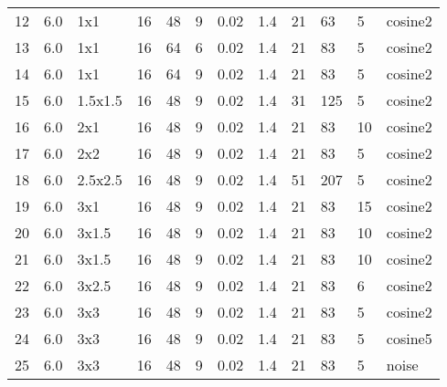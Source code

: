 \begin{center}
\begin{tabular}{l | c | l | l l l l l l l l | l}
        12  & 6.0    & 1x1       & 16    & 48       & 9      & 0.02             & 1.4                  & 21               & 63    & 5   & cosine2 \\ 
        13  & 6.0    & 1x1       & 16    & 64       & 6      & 0.02             & 1.4                  & 21               & 83    & 5   & cosine2 \\ 
        14  & 6.0    & 1x1       & 16    & 64       & 9      & 0.02             & 1.4                  & 21               & 83    & 5   & cosine2 \\
        15  & 6.0    & 1.5x1.5   & 16    & 48       & 9      & 0.02             & 1.4                  & 31               & 125   & 5   & cosine2 \\
        16  & 6.0    & 2x1       & 16    & 48       & 9      & 0.02             & 1.4                  & 21               & 83    & 10  & cosine2 \\ 
        17  & 6.0    & 2x2       & 16    & 48       & 9      & 0.02             & 1.4                  & 21               & 83    & 5   & cosine2 \\ 
        18  & 6.0    & 2.5x2.5   & 16    & 48       & 9      & 0.02             & 1.4                  & 51               & 207   & 5   & cosine2 \\ 
        19  & 6.0    & 3x1       & 16    & 48       & 9      & 0.02             & 1.4                  & 21               & 83    & 15  & cosine2 \\ 
        20  & 6.0    & 3x1.5     & 16    & 48       & 9      & 0.02             & 1.4                  & 21               & 83    & 10  & cosine2 \\ 
        21  & 6.0    & 3x1.5     & 16    & 48       & 9      & 0.02             & 1.4                  & 21               & 83    & 10  & cosine2 \\ 
        22  & 6.0    & 3x2.5     & 16    & 48       & 9      & 0.02             & 1.4                  & 21               & 83    & 6   & cosine2 \\ 
        23  & 6.0    & 3x3       & 16    & 48       & 9      & 0.02             & 1.4                  & 21               & 83    & 5   & cosine2 \\ 
        24  & 6.0    & 3x3       & 16    & 48       & 9      & 0.02             & 1.4                  & 21               & 83    & 5   & cosine5 \\
        25  & 6.0    & 3x3       & 16    & 48       & 9      & 0.02             & 1.4                  & 21               & 83    & 5   & noise   \\

\end{tabular}
\end{center}
